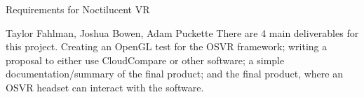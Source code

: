 \documentclass[titlepage]{article}
\begin{document}
\begin{titlepage}
\centering
{\Huge Requirements for Noctilucent VR\par}
{\Large Taylor Fahlman, Joshua Bowen, Adam Puckette}
\abstract
There are 4 main deliverables for this project. Creating an OpenGL test for the OSVR framework;
writing a proposal to either use CloudCompare or other software; a simple documentation/summary of
the final product; and the final product, where an OSVR headset can interact with the software.
\end{titlepage}
\end{document}
